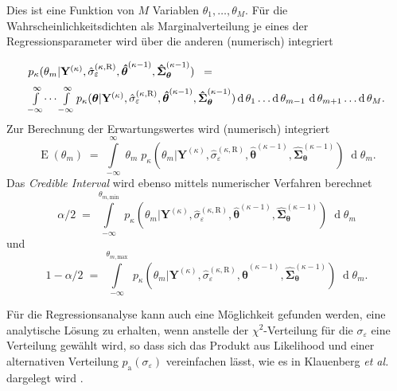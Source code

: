 Dies ist eine Funktion von $M$ Variablen $\theta_1, \dots, \theta_M$.
Für die Wahrscheinlichkeitsdichten als Marginalverteilung je eines der
Regressionsparameter wird über die anderen (numerisch) integriert
\begin{equation}
\arraycolsep=2.0pt\def\arraystretch{2.0}
\begin{array}{l}
p_{\kappa}(\theta_m | \mathbf{Y}^{(\kappa)}, \hat \sigma_{\varepsilon}^{(\kappa,\mathrm{R})},  \boldsymbol{\hat \theta}^{(\kappa-1)},  \boldsymbol{\hat \Sigma}^{(\kappa-1)}_{\boldsymbol{\theta}}) \;
\; =\\
\int\limits_{-\infty}^\infty \dots \int\limits_{-\infty}^\infty
p_{\kappa}(\boldsymbol{\theta}| \mathbf{Y}^{(\kappa)}, \hat \sigma_{\varepsilon}^{(\kappa,\mathrm{R})},  \boldsymbol{\hat \theta}^{(\kappa-1)},  \boldsymbol{\hat \Sigma}^{(\kappa-1)}_{\boldsymbol{\theta}}) \operatorname{d}\theta_1 \dots \operatorname{d}\theta_{m-1} \, \operatorname{d}\theta_{m+1} \dots
\operatorname{d}\theta_M .
\end{array}
\end{equation}
Zur Berechnung der Erwartungswertes wird (numerisch) integriert
\begin{equation}
\operatorname{E}(\theta_m) \; = \;
\int\limits_{-\infty}^\infty \; \theta_m \;
p_{\kappa}(\theta_m | \mathbf{Y}^{(\kappa)}, \hat \sigma_{\varepsilon}^{(\kappa,\mathrm{R})},  \boldsymbol{\hat \theta}^{(\kappa-1)},  \boldsymbol{\hat \Sigma}^{(\kappa-1)}_{\boldsymbol{\theta}}) \;
\operatorname{d}\theta_{m} .
\end{equation}
Das \textsl{Credible Interval} wird ebenso mittels numerischer Verfahren berechnet
\begin{equation}
\alpha/2 \; = \; \int\limits_{-\infty}^{\theta_{m,\mathrm{min}}} \; p_{\kappa}(\theta_m | \mathbf{Y}^{(\kappa)}, \hat \sigma_{\varepsilon}^{(\kappa,\mathrm{R})},  \boldsymbol{\hat \theta}^{(\kappa-1)},  \boldsymbol{\hat \Sigma}^{(\kappa-1)}_{\boldsymbol{\theta}}) \;
\operatorname{d}\theta_{m}
\end{equation}
und
\begin{equation}
1 - \alpha/2 \; = \; \int\limits_{-\infty}^{\theta_{m,\mathrm{max}}} \; p_{\kappa}(\theta_m | \mathbf{Y}^{(\kappa)}, \hat \sigma_{\varepsilon}^{(\kappa,\mathrm{R})},  \boldsymbol{\hat \theta}^{(\kappa-1)},  \boldsymbol{\hat \Sigma}^{(\kappa-1)}_{\boldsymbol{\theta}}) \;
\operatorname{d}\theta_{m} .
\end{equation}

Für die Regressionsanalyse kann auch eine Möglichkeit gefunden werden, eine analytische
Lösung zu erhalten, wenn anstelle der $\chi^2$-Verteilung für die $\sigma_{\varepsilon}$
eine Verteilung gewählt wird, so dass sich das Produkt aus Likelihood und einer
alternativen Verteilung $p_{\mathrm{a}}(\sigma_{\varepsilon})$
vereinfachen lässt, wie es in Klauenberg \textsl{et al.\ } dargelegt wird \cite{Kla15}.

